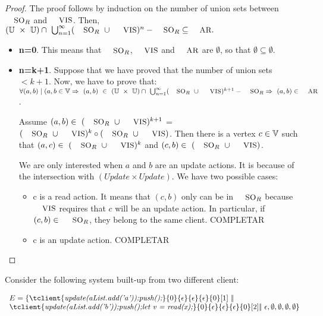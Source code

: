 \documentclass[envcountsect,runningheads,orivec]{llncs}
\begin{document}
\begin{proof} 
The proof follows by induction on the number of union sets between $\textsc{\small{SO}}_R$ and $\textsc{\small{VIS}}$. Then, $(\mathbb{U}\ \times \ \mathbb{U}) \cap \ \bigcup_{n=1}^{\infty} (\textsc{\small{SO}}_R \ \cup \ \textsc{\small{VIS}} ) ^{n} - \textsc{\small{SO}}_R \subseteq \textsc{\small{AR}}.$


\begin{itemize}
   \item{\bf n=0}. This means that $\textsc{\small{SO}}_R$, $\textsc{\small{VIS}}$ and  $\textsc{\small{AR}}$ are $\emptyset$, so that $\emptyset \subseteq \emptyset$.
   \item{\bf n=k+1}. Suppose that we have proved that the number of union sets $< k+1$. Now, we have to prove that: $\forall (a,b) \mid (a,b \in \verticesets \Rightarrow\ (a,b)\ \in\ (\mathbb{U}\ \times \ \mathbb{U}) \cap \ \bigcup_{n=1}^{\infty} (\textsc{\small{SO}}_R \ \cup \ \textsc{\small{VIS}} ) ^{k+1} - \textsc{\small{SO}}_R \Rightarrow\ (a,b) \in \textsc{\small{AR}}$. 

Assume $(a,b) \in\ (\textsc{\small{SO}}_R \ \cup \ \textsc{\small{VIS}} ) ^{k+1} $ = $(\textsc{\small{SO}}_R \ \cup \ \textsc{\small{VIS}} ) ^{k} \circ (\textsc{\small{SO}}_R \ \cup \ \textsc{\small{VIS}})$. Then there is a vertex $c \in \mathbb{V}$ such
that $(a,c) \in\ (\textsc{\small{SO}}_R \ \cup \ \textsc{\small{VIS}} ) ^{k}$ and $(c, b) \in\ (\textsc{\small{SO}}_R \ \cup \ \textsc{\small{VIS}} )$.

We are only interested when $a$ and $b$ are an update actions. It is because of the intersection with $(Update \times Update)$. We have two possible cases:
\begin{itemize}
	\item c is a read action. It means that $(c,b)$ only can be in $\textsc{\small{SO}}_R$ because $\textsc{\small{VIS}}$ requires that $c$ will be an update action. In particular, if  $(c,b) \in\ \textsc{\small{SO}}_R$, they belong to the same client. COMPLETAR
	
	\item c is an update action. COMPLETAR
\end{itemize}
\end{itemize}

\end{proof}


\begin{example} 
\label{consistent-prefix}Consider the following system built-up from two 
different client:

\[
\begin{array}{l}
E = \environment{\tclient{\textit{update(aList.add('a'));push();}}{0}{\epsilon}{\epsilon}{\epsilon}{0}[1]\ \bigpar\
\\
\tclient{\textit{update(aList.add('b'));push();let v = read(x);}}{0}{\epsilon}{\epsilon}{\epsilon}{0}[2]  \bigpar\ \epsilon}{\emptyset}{\emptyset}{\emptyset}{\emptyset}
\end{array}
\]
\end{example}
		
\end{document}
